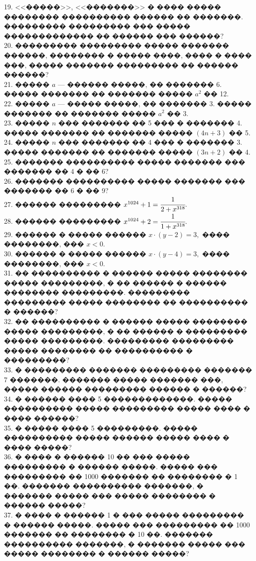 \documentclass[12pt]{article}
\begin{document}
19. <<�����>>, <<�������>> � ���� ����� �������� ���������� ������ �� �������. ��������� ��������� ��� ����� ������������� �� ������ ��� ������?\\
20. ��������� ��������� ����� ������� ������, �������� � ����� ����, ���� � ���� ���, ����� ������� ��������� �� ������ ������?\\
21. ����� $a$ --- ������ �����, �� ������� 6. ����� ������� �� ������� ����� $a^2$ �� 12.\\
22. ����� $a$ --- ����� �����, �� ������� 3. ����� ������� �� ������� ����� $a^2$ �� 3.\\
23. ����� $n$ ��� ������� �� 5 ��� � ������� 4. ����� ������� �� ������� ����� $(4n+3)$ �� 5.\\
24. ����� $n$ ��� ������� �� 4 ��� � ������� 3. ����� ������� �� ������� ����� $(3n+2)$ �� 4.\\
25. ������� ���������� ����� ������� ��� ������� �� 4 � �� 6?\\
26. ������� ���������� ����� ������� ��� ������� �� 6 � �� 9?\\
27. ������ ��������� $x^{1024}+1=\cfrac{1}{2+x^{318}}.$\\
28. ������ ��������� $x^{1024}+2=\cfrac{1}{1+x^{318}}.$\\
29. ������ � ����� ������ $x\cdot (y-2)=3,$ ���� ��������, ��� $x<0.$\\
30. ������ � ����� ������ $x\cdot (y-4)=3,$ ���� ��������, ��� $x<0.$\\
31. �� ���������� � ������ ����� �������� ����� ���������, � �� ������ � ������ �������� ���������. ��������� ��������� ����� �������� �� ���������� � ������?\\
32. �� ���������� � ������ ����� �������� ����� ���������, � �� ������ � ��������� ����� ���������. ��������� ��������� ����� �������� �� ���������� � ���������?\\
33. � ��������� ������� ��������� ������� 7 �������. ������� ����� ������� ���, ����� ������ ��������� ������ � ������?\\
34. � ������ ���� 5 �������������. ����� ���������� ����� ��������� ����� ���� � ���� ������?\\
35. � ����� ���� 5 ���������. ����� ���������� ����� ������ ����� ���� � ���� �����?\\
36. � ���� � ������ 10 �� ��� ����� ��������� � ������ �����. ����� ��� ��������� �� 1000 ������� �� �������� � 1 ��. ������� ���������� �������, � ������� ����� ��� ����� �������� � ������ �����?\\
37. � ���� � ������ 1 � ��� ����� ��������� � ������ �����. ����� ��� ��������� �� 1000 ������� �� �������� � 10 ��. ������� ���������� �������, � ������� ����� ��� ����� �������� � ������ �����?\\
\end{document}
